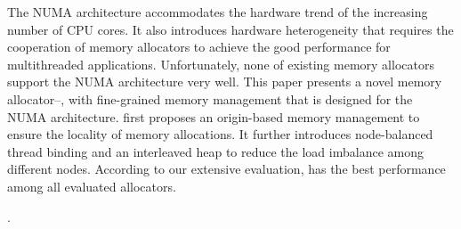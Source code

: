 The NUMA architecture accommodates the hardware trend of the increasing number of CPU cores. It also introduces hardware heterogeneity that requires the cooperation of memory allocators to achieve the good performance for multithreaded applications. Unfortunately, none of existing memory allocators support the NUMA architecture very well. 
This paper presents a novel memory allocator--\NM{}, with fine-grained memory management that is designed for the NUMA architecture. \NM{} first proposes an origin-based memory management to ensure the locality of memory allocations. It further introduces node-balanced thread binding and an interleaved heap to reduce the load imbalance among different nodes. 
According to our extensive evaluation, \NM{} has the best performance among all evaluated allocators. 

.